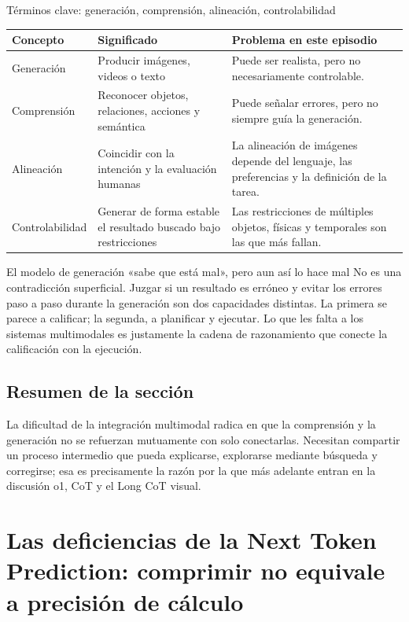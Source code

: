 \documentclass[a4paper]{article}
\begin{document}
\begin{knowledgebox}{Términos clave: generación, comprensión, alineación, controlabilidad}
\noindent\begin{tabularx}{\textwidth}{p{}p{}X}
\toprule
Concepto & Significado & Problema en este episodio \\
\midrule
Generación & Producir imágenes, videos o texto & Puede ser realista, pero no necesariamente controlable. \\
Comprensión & Reconocer objetos, relaciones, acciones y semántica & Puede señalar errores, pero no siempre guía la generación. \\
Alineación & Coincidir con la intención y la evaluación humanas & La alineación de imágenes depende del lenguaje, las preferencias y la definición de la tarea. \\
Controlabilidad & Generar de forma estable el resultado buscado bajo restricciones & Las restricciones de múltiples objetos, físicas y temporales son las que más fallan. \\
\bottomrule
\end{tabularx}
\end{knowledgebox}

\begin{warningbox}{El modelo de generación «sabe que está mal», pero aun así lo hace mal}
No es una contradicción superficial. Juzgar si un resultado es erróneo y evitar los errores paso a paso durante la generación son dos capacidades distintas. La primera se parece a calificar; la segunda, a planificar y ejecutar. Lo que les falta a los sistemas multimodales es justamente la cadena de razonamiento que conecte la calificación con la ejecución.
\end{warningbox}

\subsection{Resumen de la sección}

La dificultad de la integración multimodal radica en que la comprensión y la generación no se refuerzan mutuamente con solo conectarlas. Necesitan compartir un proceso intermedio que pueda explicarse, explorarse mediante búsqueda y corregirse; esa es precisamente la razón por la que más adelante entran en la discusión o1, CoT y el Long CoT visual.
\section{Las deficiencias de la Next Token Prediction: comprimir no equivale a precisión de cálculo}
\end{document}
